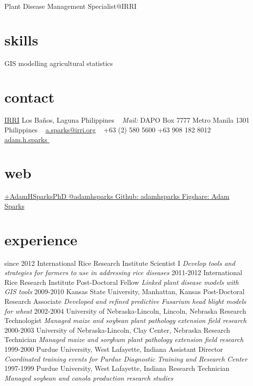 
       {Plant Disease Management Specialist@IRRI}


\begin{aside}
\section{skills}
\small{GIS
modelling
agricultural statistics
~
\section{contact}
\href{http://www.irri.org/}{IRRI}
Los Ba\~nos, Laguna
Philippines
~
\emph{Mail:}
DAPO Box 7777
Metro Manila
1301 Philippines
~
\href{mailto:a.sparks@irri.org}{a.sparks@irri.org}
~
+63 (2) 580 5600 \faPhone
+63 908 182 8012  \faMobilePhone
{\href{skype:adam.h.sparks?call}{adam.h.sparks }}
~
\section{web}
\href{https://plus.google.com/+AdamHSparksPhD}{+AdamHSparksPhD {\color{google.plus}\faGooglePlusSign}}
\href{https://www.twitter.com/adamhsparks/}{@adamhsparks {\color{twitter.blue}\faTwitter}}
\href{https://github.com/adamhsparks/}{Github: adamhsparks \faGithub}
\href{http://figshare.com/authors/Adam_Sparks/535457}{Figshare: Adam Sparks}}
\end{aside}

\section{experience}
\begin{entrylist}
  \entry
    {since 2012}
    {International Rice Research Institute }
    {Scientist I}
    {\emph{Develop tools and strategies for farmers to use in addressing rice diseases}}
  \entry
    {2011-2012}
    {International Rice Research Institute }
    {Post-Doctoral Fellow}
    {\emph{Linked plant disease models with GIS tools}}
  \entry
    {2009-2010}
    {Kansas State University, Manhattan, Kansas}
    {Post-Doctoral Research Associate}
    {\emph{Developed and refined predictive Fusarium head blight models for wheat}}
  \entry
   {2002-2004}
   {University of Nebraska-Lincoln, Lincoln, Nebraska}
   {Research Technologist}
   {\emph{Managed maize and soybean plant pathology extension field research}}
  \entry
   {2000-2003}
   {University of Nebraska-Lincoln, Clay Center, Nebraska}
   {Research Technician}
   {\emph{Managed maize and sorghum plant pathology extension field research}}
  \entry
   {1999-2000}
   {Purdue University, West Lafayette, Indiana}
   {Assistant Director}
   {\emph{Coordinated training events for Purdue Diagnostic Training and Research Center}}
  \entry
   {1997-1999}
   {Purdue University, West Lafayette, Indiana}
   {Research Technician}
   {\emph{Managed soybean and canola production research studies}}
\end{entrylist}

